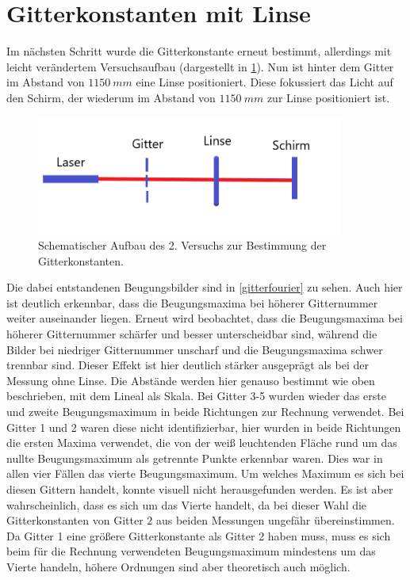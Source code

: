 \section{Gitterkonstanten mit Linse}
Im nächsten Schritt wurde die Gitterkonstante erneut bestimmt, allerdings mit leicht verändertem Versuchsaufbau (dargestellt in \cref{aufbaugitter2}). Nun ist hinter dem Gitter im Abstand von $\SI{1150}{mm}$ eine Linse positioniert. Diese fokussiert das Licht auf den Schirm, der wiederum im Abstand von $\SI{1150}{mm}$ zur Linse positioniert ist.

\begin{figure}[h]
	\centering
	\includegraphics[width=0.9\textwidth]{Lana-Bild3}
	\caption{Schematischer Aufbau des 2. Versuchs zur Bestimmung der Gitterkonstanten.}
	\label{aufbaugitter2}
\end{figure}

Die dabei entstandenen Beugungsbilder sind in \cref{gitterfourier} zu sehen. Auch hier ist deutlich erkennbar, dass die Beugungsmaxima bei höherer Gitternummer weiter auseinander liegen. Erneut wird beobachtet, dass die Beugungsmaxima bei höherer Gitternummer schärfer und besser unterscheidbar sind, während die Bilder bei niedriger Gitternummer unscharf und die Beugungsmaxima schwer trennbar sind. Dieser Effekt ist hier deutlich stärker ausgeprägt als bei der Messung ohne Linse.
Die Abstände werden hier genauso bestimmt wie oben beschrieben, mit dem Lineal als Skala. Bei Gitter 3-5 wurden wieder das erste und zweite Beugungsmaximum in beide Richtungen zur Rechnung verwendet. Bei Gitter 1 und 2 waren diese nicht identifizierbar, hier wurden in beide Richtungen die ersten Maxima verwendet, die von der weiß leuchtenden Fläche rund um das nullte Beugungsmaximum als getrennte Punkte erkennbar waren. Dies war in allen vier Fällen das vierte Beugungsmaximum. Um welches Maximum es sich bei diesen Gittern handelt, konnte visuell nicht herausgefunden werden. Es ist aber wahrscheinlich, dass es sich um das Vierte handelt, da bei dieser Wahl die Gitterkonstanten von Gitter 2 aus beiden Messungen ungefähr übereinstimmen. Da Gitter 1 eine größere Gitterkonstante als Gitter 2 haben muss, muss es sich beim für die Rechnung verwendeten Beugungsmaximum mindestens um das Vierte handeln, höhere Ordnungen sind aber theoretisch auch möglich.


